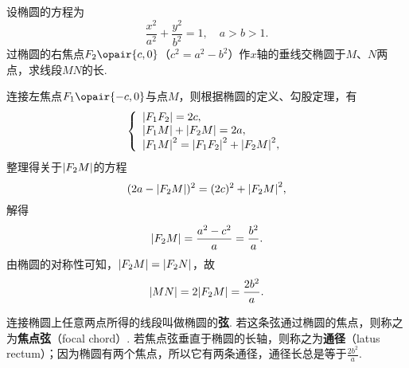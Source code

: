 \begin{example}
设椭圆的方程为\[
\frac{x^2}{a^2}+\frac{y^2}{b^2}=1, \quad a>b>1.
\]过椭圆的右焦点\(F_2\opair{c,0}\)（\(c^2=a^2-b^2\)）作\(x\)轴的垂线交椭圆于\(M\)、\(N\)两点，求线段\(MN\)的长.
\begin{solution}
连接左焦点\(F_1\opair{-c,0}\)与点\(M\)，则根据椭圆的定义、勾股定理，有\[
\left\{ \begin{array}{l}
\abs{F_1 F_2} = 2c, \\
\abs{F_1 M} + \abs{F_2 M} = 2a, \\
\abs{F_1 M}^2 = \abs{F_1 F_2}^2 + \abs{F_2 M}^2,
\end{array} \right.
\]整理得关于\(\abs{F_2 M}\)的方程\[
(2a - \abs{F_2 M})^2 = (2c)^2 + \abs{F_2 M}^2,
\]解得\[
\abs{F_2 M} = \frac{a^2 - c^2}{a} = \frac{b^2}{a}.
\]由椭圆的对称性可知，\(\abs{F_2 M} = \abs{F_2 N}\)，故\[
\abs{MN} = 2\abs{F_2 M} = \frac{2 b^2}{a}.
\]
\end{solution}

连接椭圆上任意两点所得的线段叫做椭圆的\textbf{弦}.
若这条弦通过椭圆的焦点，则称之为\textbf{焦点弦}（focal chord）.
若焦点弦垂直于椭圆的长轴，则称之为\textbf{通径}（latus rectum）；因为椭圆有两个焦点，所以它有两条通径，通径长总是等于\(\frac{2b^2}{a}\).
\end{example}


